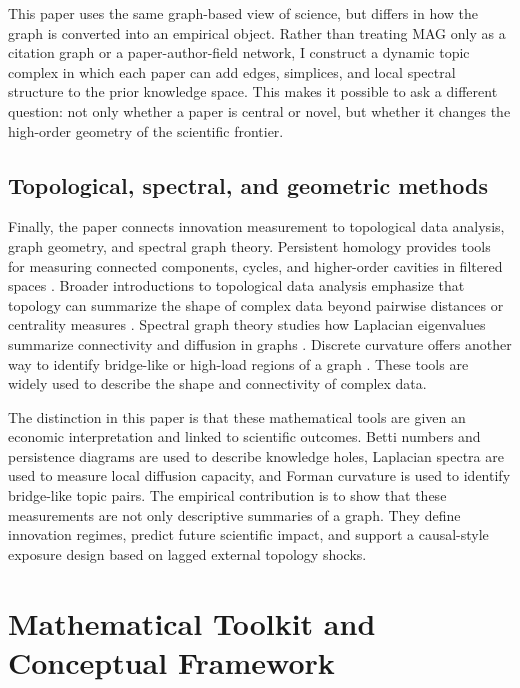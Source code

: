 \documentclass[preprint,12pt,authoryear]{elsarticle}
\begin{document}
This paper uses the same graph-based view of science, but differs in how the graph is converted into an empirical object. Rather than treating MAG only as a citation graph or a paper-author-field network, I construct a dynamic topic complex in which each paper can add edges, simplices, and local spectral structure to the prior knowledge space. This makes it possible to ask a different question: not only whether a paper is central or novel, but whether it changes the high-order geometry of the scientific frontier.

\subsection{Topological, spectral, and geometric methods}

Finally, the paper connects innovation measurement to topological data analysis, graph geometry, and spectral graph theory. Persistent homology provides tools for measuring connected components, cycles, and higher-order cavities in filtered spaces \citep{edelsbrunner2002topological,zomorodian2005computing}. Broader introductions to topological data analysis emphasize that topology can summarize the shape of complex data beyond pairwise distances or centrality measures \citep{ghrist2008barcodes,carlsson2009topology}. Spectral graph theory studies how Laplacian eigenvalues summarize connectivity and diffusion in graphs \citep{chung1997spectral}. Discrete curvature offers another way to identify bridge-like or high-load regions of a graph \citep{forman2003bochner}. These tools are widely used to describe the shape and connectivity of complex data.

The distinction in this paper is that these mathematical tools are given an economic interpretation and linked to scientific outcomes. Betti numbers and persistence diagrams are used to describe knowledge holes, Laplacian spectra are used to measure local diffusion capacity, and Forman curvature is used to identify bridge-like topic pairs. The empirical contribution is to show that these measurements are not only descriptive summaries of a graph. They define innovation regimes, predict future scientific impact, and support a causal-style exposure design based on lagged external topology shocks.

\section{Mathematical Toolkit and Conceptual Framework}
\end{document}
